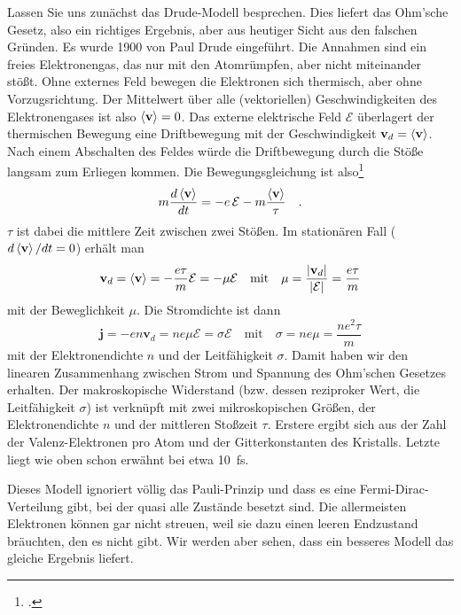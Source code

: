 Lassen Sie uns zunächst das Drude-Modell besprechen. Dies liefert das Ohm'sche Gesetz, also ein richtiges Ergebnis, aber aus heutiger Sicht aus den falschen Gründen. Es wurde 1900 von Paul Drude eingeführt. Die Annahmen sind ein freies Elektronengas, das nur mit den  Atomrümpfen, aber nicht miteinander stößt. Ohne externes Feld bewegen die Elektronen sich thermisch, aber ohne Vorzugsrichtung. Der Mittelwert über alle (vektoriellen) Geschwindigkeiten des Elektronengases ist also $\braket{\mathbf{v}} = 0$. Das externe elektrische Feld $\mathcal{E}$ überlagert der thermischen Bewegung eine Driftbewegung mit der Geschwindigkeit $\mathbf{v}_d = \braket{\mathbf{v}}$. Nach einem Abschalten des Feldes würde die Driftbewegung durch die Stöße langsam zum Erliegen kommen. Die Bewegungsgleichung ist also\footcite{Singleton_band_theory,Simon_solid_state_basics}
\begin{equation}
   m \frac{d \braket{\mathbf{v}} }{dt} = -e \, \mathcal{E} - m \frac{\braket{\mathbf{v}} }{\tau} \quad .
\end{equation}
$\tau$ ist dabei die mittlere Zeit zwischen zwei Stößen. Im stationären Fall 
($d \braket{\mathbf{v}} / dt = 0$) erhält man   
\begin{equation}
   \mathbf{v}_d =\braket{\mathbf{v}} =  - \frac{e \tau}{m} \mathcal{E} = - \mu \mathcal{E} 
   \quad \text{mit} \quad
    \mu = \frac{| \mathbf{v}_d |}{|\mathcal{E}|} = \frac{e \tau}{m}
\end{equation}
mit der Beweglichkeit $\mu$. Die Stromdichte ist dann
\begin{equation}
   \mathbf{j} = -e n  \mathbf{v}_d = n e \mu \mathcal{E} = \sigma \mathcal{E} 
   \quad \text{mit} \quad 
   \sigma = n e \mu  = \frac{n e^2 \tau}{m}
\end{equation}
mit der Elektronendichte $n$ und der Leitfähigkeit $\sigma$. Damit haben wir den linearen Zusammenhang zwischen Strom und Spannung des Ohm'schen Gesetzes erhalten. Der makroskopische Widerstand (bzw. dessen reziproker Wert, die Leitfähigkeit $\sigma$) ist verknüpft mit zwei mikroskopischen  Größen, der Elektronendichte $n$ und der mittleren Stoßzeit $\tau$. Erstere ergibt sich aus der Zahl der Valenz-Elektronen pro Atom und der Gitterkonstanten des Kristalls. Letzte liegt wie oben schon erwähnt bei etwa 10~fs.

Dieses Modell ignoriert völlig das Pauli-Prinzip und dass es eine Fermi-Dirac-Verteilung gibt, bei der quasi alle Zustände besetzt sind. Die allermeisten Elektronen können gar nicht streuen, weil sie dazu einen leeren Endzustand bräuchten, den es nicht gibt. Wir werden aber sehen, dass ein besseres Modell das gleiche Ergebnis liefert.

